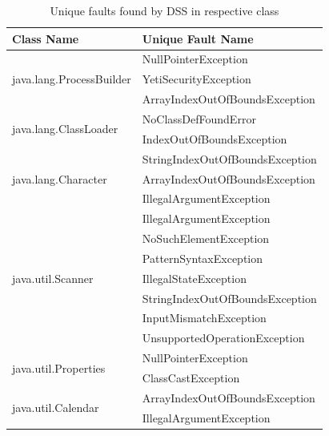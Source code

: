 \documentclass[conference]{IEEEtran}
\begin{document}
\begin{table}[H]
\caption{Unique faults found by DSS in respective class} %
\centering %
\begin{tabular}{| l | l |} %
\hline\hline %
Class Name & Unique Fault Name \\ [0.5ex] %
\hline %
\multirow{3}{*}{java.lang.ProcessBuilder} & NullPointerException\\ %
& YetiSecurityException\\ %
& ArrayIndexOutOfBoundsException\\ %
\hline
\multirow{2}{*}{java.lang.ClassLoader} & NoClassDefFoundError\\ %
& IndexOutOfBoundsException\\ %
\hline
\multirow{3}{*}{java.lang.Character} & StringIndexOutOfBoundsException\\ %
& ArrayIndexOutOfBoundsException\\ %
& IllegalArgumentException\\ %
\hline
\multirow{7}{*}{java.util.Scanner} & IllegalArgumentException\\ %
& NoSuchElementException\\ %
& PatternSyntaxException\\ %
& IllegalStateException\\ %
& StringIndexOutOfBoundsException\\ %
& InputMismatchException\\ %
& UnsupportedOperationException\\ %
\hline
\multirow{2}{*}{java.util.Properties} & NullPointerException\\ %
& ClassCastException\\ %
\hline
\multirow{2}{*}{java.util.Calendar} & ArrayIndexOutOfBoundsException\\ %
& IllegalArgumentException\\ %

\end{tabular}
\end{table}
\end{document}

